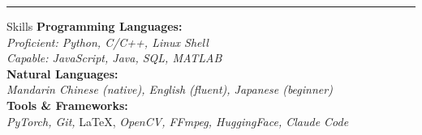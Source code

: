 \vspace{10pt}
\hrule
\begin{rSection}{Skills}
    {\bf Programming Languages:} \\
    \textit{{Proficient:} Python, C/C++, Linux Shell\\
    {Capable:} JavaScript, Java, SQL, MATLAB} \\[0.2cm]
    {\bf Natural Languages:} \\
    \textit{Mandarin Chinese (native), English (fluent), Japanese (beginner)} \\[0.2cm]
    {\bf Tools \& Frameworks:}\\
    \textit{PyTorch, Git,} \LaTeX, \textit{OpenCV, FFmpeg, HuggingFace, Claude Code}
\end{rSection}
